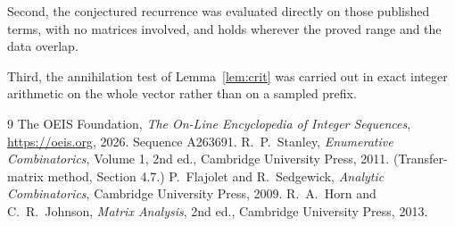 \documentclass[11pt,a4paper]{article}
\theoremstyle{plain}
\theoremstyle{definition}
\begin{document}
Second, the conjectured recurrence was evaluated directly on those published terms, with no
matrices involved, and holds wherever the proved range and the data overlap.

Third, the annihilation test of Lemma~\ref{lem:crit} was carried out in exact integer
arithmetic on the whole vector rather than on a sampled prefix.

\begin{thebibliography}{9}
 The OEIS Foundation, \emph{The On-Line Encyclopedia of Integer
Sequences}, \url{https://oeis.org}, 2026. Sequence A263691.
 R.~P.~Stanley, \emph{Enumerative Combinatorics}, Volume 1, 2nd ed.,
Cambridge University Press, 2011. (Transfer-matrix method, Section 4.7.)
 P.~Flajolet and R.~Sedgewick, \emph{Analytic Combinatorics}, Cambridge
University Press, 2009.
 R.~A.~Horn and C.~R.~Johnson, \emph{Matrix Analysis}, 2nd ed., Cambridge
University Press, 2013.
\end{thebibliography}
\end{document}
